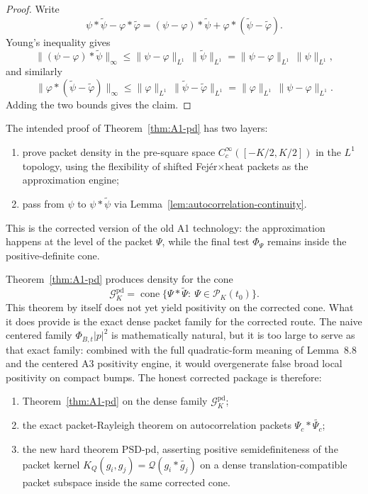 \begin{proof}
Write
\[
  \psi*\widetilde{\psi}-\varphi*\widetilde{\varphi}
  =
  (\psi-\varphi)*\widetilde{\psi}
  + \varphi*(\widetilde{\psi}-\widetilde{\varphi}).
\]
Young's inequality gives
\[
  \|(\psi-\varphi)*\widetilde{\psi}\|_\infty
  \le \|\psi-\varphi\|_{L^1}\,\|\widetilde{\psi}\|_{L^1}
  = \|\psi-\varphi\|_{L^1}\,\|\psi\|_{L^1},
\]
and similarly
\[
  \|\varphi*(\widetilde{\psi}-\widetilde{\varphi})\|_\infty
  \le \|\varphi\|_{L^1}\,\|\widetilde{\psi}-\widetilde{\varphi}\|_{L^1}
  = \|\varphi\|_{L^1}\,\|\psi-\varphi\|_{L^1}.
\]
Adding the two bounds gives the claim.
\end{proof}

\begin{remark}\label{rem:A1-pd-skeleton}
The intended proof of Theorem~\ref{thm:A1-pd} has two layers:
\begin{enumerate}
  \item prove packet density in the pre-square space
  $C_c^\infty([-K/2,K/2])$ in the $L^1$ topology, using the flexibility of
  shifted Fej\'er$\times$heat packets as the approximation engine;
  \item pass from $\psi$ to $\psi*\widetilde{\psi}$ via
  Lemma~\ref{lem:autocorrelation-continuity}.
\end{enumerate}
This is the corrected version of the old A1 technology: the approximation happens
at the level of the packet $\Psi$, while the final test $\Phi_\Psi$ remains inside
the positive-definite cone.
\end{remark}

\begin{remark}\label{rem:a1-pd-not-same-family}
Theorem~\ref{thm:A1-pd} produces density for the cone
\[
  \mathcal G_K^{\mathrm{pd}}
  = \operatorname{cone}\{\Psi*\widetilde{\Psi}:\ \Psi\in\mathcal P_K(t_0)\}.
\]
This theorem by itself does not yet yield positivity on the corrected cone. What it
does provide is the exact dense packet family for the corrected route. The naive
centered family $\Phi_{B,t}|p|^2$ is mathematically natural, but it is too large to
serve as that exact family: combined with the full quadratic-form meaning of
Lemma~8.8 and the centered A3 positivity engine, it would overgenerate false broad
local positivity on compact bumps. The honest corrected package is therefore:
\begin{enumerate}
  \item Theorem~\ref{thm:A1-pd} on the dense family $\mathcal G_K^{\mathrm{pd}}$;
  \item the exact packet-Rayleigh theorem on autocorrelation packets
  $\Psi_c * \widetilde{\Psi_c}$;
  \item the new hard theorem PSD-pd, asserting positive semidefiniteness of the
  packet kernel $K_Q(g_i,g_j)=\mathcal Q(g_i * \widetilde{g_j})$ on a dense
  translation-compatible packet subspace inside the same corrected cone.
\end{enumerate}
\end{remark}

